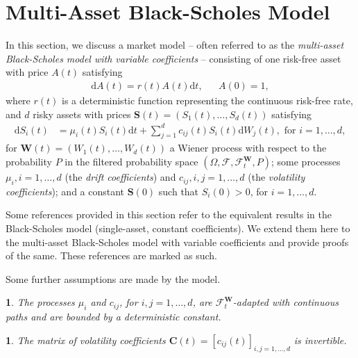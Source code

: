 \documentclass[english]{article}
\numberwithin{equation}{section}
\numberwithin{figure}{section}
\theoremstyle{bolddescit}
\theoremstyle{definition}
\theoremstyle{definition}
\theoremstyle{plain}
\theoremstyle{plain}
\theoremstyle{bolddesc}
\newtheorem{assumption}[theorem]{\protect\assumptionname}
\theoremstyle{plain}
\theoremstyle{remark}
\providecommand{\assumptionname}{Assumption}
\begin{document}
\section{Multi-Asset Black-Scholes Model}\label{sec:black-scholes}

In this section, we discuss a market model -- often referred to as the \textit{multi-asset Black-Scholes model with variable coefficients} -- consisting of one risk-free asset with price $A(t)$ satisfying
\begin{align}\label{eq:multi-bs-eq-risk-free}
  \mathrm{d}A(t) = r(t) A(t) \mathrm{d}t, && A(0) = 1,
\end{align}
where $r(t)$ is a deterministic function representing the continuous risk-free rate, and $d$ risky assets with prices $\mathbf{S}(t) = (S_1(t), \ldots, S_d(t))$ satisfying
\begin{align}
  \mathrm{d}S_i(t) &= \mu_i(t) S_i(t) \mathrm{d}t + \sum_{j=1}^{d} c_{ij}(t) S_i(t) \mathrm{d}W_j(t), \text{ for } i = 1,\ldots,d,\label{eq:multi-bs-eq}
\end{align}
for $\mathbf{W}(t) = (W_1(t), \ldots, W_d(t))$ a Wiener process with respect to the probability $P$ in the filtered probability space $(\Omega, \mathcal{F}, \mathcal{F}^\mathbf{W}_t, P)$; some processes $\mu_i, i=1,\ldots,d$ (the \textit{drift coefficients}) and $c_{ij}, i,j=1,\ldots,d$ (the \textit{volatility coefficients}); and a constant $\mathbf{S}(0)$ such that $S_i(0) > 0$, for $i=1,\ldots,d$.

Some references provided in this section refer to the equivalent results in the Black-Scholes model (single-asset, constant coefficients). We extend them here to the multi-asset Black-Scholes model with variable coefficients and provide proofs of the same. These references are marked as such.

Some further assumptions are made by the model.

\begin{assumption}\label{ass:drift-vol-regularity}
  The processes $\mu_i$ and $c_{ij}$, for $i,j=1,\ldots,d$, are $\mathcal{F}^\mathbf{W}_t$-adapted with continuous paths and are bounded by a deterministic constant.
\end{assumption}

\begin{assumption}\label{ass:vol-matrix-invertible}
  The matrix of volatility coefficients $\mathbf{C}(t)= [c_{ij}(t)]_{i,j=1,\ldots,d}$ is invertible.
\end{assumption}
\end{document}
